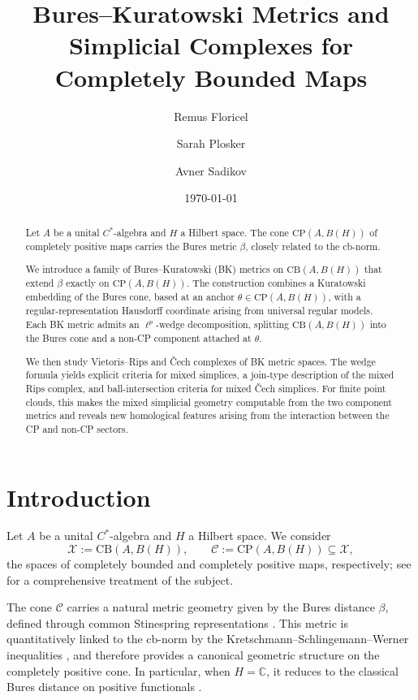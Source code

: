 \documentclass[11pt]{amsart}
\title[Bures--Kuratowski Metrics and Simplicial Complexes for Completely Bounded Maps]{Bures--Kuratowski Metrics and Simplicial Complexes for Completely Bounded Maps}
\author{Remus Floricel}
\author{Sarah Plosker}
\author{Avner Sadikov}
\date{\today}
\theoremstyle{definition}
\theoremstyle{remark}
\newcommand{\C}{\mathbb C}
\newcommand{\1}{\mathbbm{1}}
\newcommand{\CP}{\mathrm{CP}}
\newcommand{\CB}{\mathrm{CB}}
\begin{document}
\begin{abstract}


Let $A$ be a unital $C^*$-algebra and $H$ a Hilbert space. The cone
$\CP(A,B(H))$ of completely positive maps carries the Bures metric $\beta$, closely related to the cb-norm.

We introduce a family of Bures--Kuratowski (BK) metrics on $\CB(A,B(H))$ that extend $\beta$ exactly on $\CP(A,B(H))$. The construction combines a Kuratowski embedding of the Bures cone, based at an anchor $\theta\in\CP(A,B(H))$, with a regular-representation Hausdorff coordinate arising from universal regular models. Each BK metric admits an $\ell^p$-wedge decomposition, splitting $\CB(A,B(H))$ into the Bures cone and a non-CP component attached at $\theta$.

We then study Vietoris--Rips and \v{C}ech complexes of BK metric spaces. The wedge formula yields explicit criteria for mixed simplices, a join-type description of the mixed Rips complex, and ball-intersection criteria for mixed \v{C}ech simplices. For finite point clouds, this makes the mixed simplicial geometry computable from the two component metrics and reveals new homological features arising from the interaction between the CP and non-CP sectors.

\end{abstract}


\maketitle

{\small\tableofcontents}



\section{Introduction}

Let $A$ be a unital $C^*$-algebra and $H$ a Hilbert space. We consider
\[
\mathcal X:=\CB(A,B(H)),
\qquad
\mathcal C:=\CP(A,B(H))\subseteq\mathcal X,
\]
the spaces of completely bounded and completely positive maps, respectively; see \cite{Paulsen, Pisier} for a comprehensive treatment of the subject. 

The cone $\mathcal C$ carries a natural metric geometry given by the Bures
distance $\beta$, defined through common Stinespring representations
\cite{KSW}. This metric is quantitatively linked to the cb-norm by the
Kretschmann--Schlingemann--Werner inequalities \cite{KSW}, and therefore provides a
canonical geometric structure on the completely positive cone. In particular,
when $H=\C$, it reduces to the classical Bures distance on positive functionals \cite{Bures}.
\end{document}
